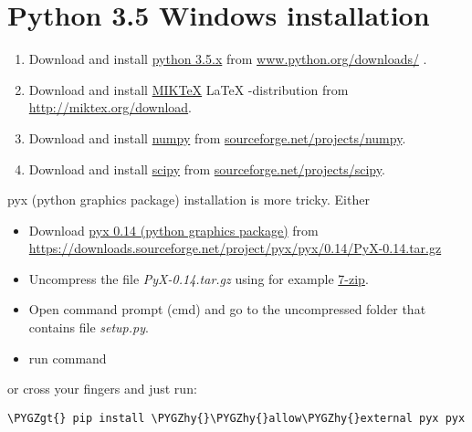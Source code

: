 \documentclass[a4paper,11pt,english]{sphinxmanual}
\def\PYGZgt{\char`\>}
\def\PYGZhy{\char`\-}
\begin{document}
\section{Python 3.5 Windows installation}
\label{installation/installation:python-3-5-windows-installation}\begin{enumerate}
\item {} 
Download and install \href{https://www.python.org}{python 3.5.x} from \href{https://www.python.org/downloads/}{www.python.org/downloads/} .

\item {} 
Download and install \href{http://miktex.org}{MIKTeX} LaTeX -distribution from \href{http://miktex.org/download}{http://miktex.org/download}.

\item {} 
Download and install \href{http://www.numpy.org}{numpy} from \href{http://sourceforge.net/projects/numpy/files/latest/download?source=files}{sourceforge.net/projects/numpy}.

\item {} 
Download and install \href{http://www.scipy.org}{scipy} from \href{http://sourceforge.net/projects/scipy/files/latest/download?source=files}{sourceforge.net/projects/scipy}.

\end{enumerate}

pyx (python graphics package) installation is more tricky. Either
\begin{itemize}
\item {} 
Download \href{http://pyx.sourceforge.net}{pyx 0.14 (python graphics package)} from \href{https://downloads.sourceforge.net/project/pyx/pyx/0.14/PyX-0.14.tar.gz}{https://downloads.sourceforge.net/project/pyx/pyx/0.14/PyX-0.14.tar.gz}

\item {} 
Uncompress the file \emph{PyX-0.14.tar.gz} using for example \href{http://www.7-zip.org}{7-zip}.

\item {} 
Open command prompt (cmd) and go to the uncompressed folder that contains file \emph{setup.py}.

\item {} 
run command 

\end{itemize}

or cross your fingers and just run:

\begin{Verbatim}[commandchars=\\\{\},formatcom=\scriptsize]
\PYGZgt{} pip install \PYGZhy{}\PYGZhy{}allow\PYGZhy{}external pyx pyx
\end{Verbatim}
\end{document}
